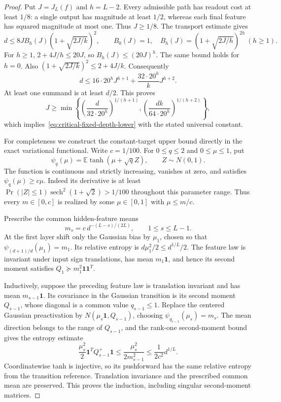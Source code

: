 \begin{proof}
Put $J=J_L(f)$ and $h=L-2$. Every admissible path has readout cost at
least $1/8$: a single output has magnitude at least $1/2$, whereas
each final feature has squared magnitude at most one. Thus $J\ge1/8$.
The transport estimate gives
\[
 d\le8J B_h(J)(1+\sqrt{2J/k})^2,
 \qquad B_0(J)=1,\quad
 B_h(J)=(1+\sqrt{2J/h})^{2h}\ (h\ge1).
\]
For $h\ge1$, $2+4J/h\le20J$, so $B_h(J)\le(20J)^h$.
The same bound holds for $h=0$. Also
$(1+\sqrt{2J/k})^2\le2+4J/k$. Consequently
\[
 d\le16\cdot20^h J^{h+1}
       +\frac{32\cdot20^h}{k}J^{h+2}.
\]
At least one summand is at least $d/2$. This proves
\[
 J\ge\min\left\{
 \left(\frac d{32\cdot20^h}\right)^{1/(h+1)},
 \left(\frac {dk}{64\cdot20^h}\right)^{1/(h+2)}\right\},
\]
which implies~\eqref{eq:critical-fixed-depth-lower} with the stated
universal constant.

For completeness we construct the constant-target upper bound directly
in the exact variational functional. Write $c=1/100$. For $0\le q\le2$
and $0\le\mu\le1$, put
\[
 \psi_q(\mu)=\mathbb E\tanh(\mu+\sqrt q Z),\qquad Z\sim N(0,1).
\]
The function is continuous and strictly increasing, vanishes at zero,
and satisfies $\psi_q(\mu)\ge c\mu$. Indeed its derivative is at least
$\Pr(|Z|\le1)\operatorname{sech}^2(1+\sqrt2)>1/100$ throughout
this parameter range. Thus every $m\in[0,c]$ is realized by some
$\mu\in[0,1]$ with $\mu\le m/c$.

Prescribe the common hidden-feature means
\[
 m_s=c\,d^{-(L-s)/(2L)},\qquad 1\le s\le L-1.
\]
At the first layer shift only the Gaussian bias by $\mu_1$, chosen
so that $\psi_{(d+1)/d}(\mu_1)=m_1$. Its relative entropy is
$d\mu_1^2/2\le d^{1/L}/2$. The feature law is invariant under input
sign translations, has mean $m_1\mathbf1$, and hence its second
moment satisfies $Q_1\succeq m_1^2\mathbf1\mathbf1^T$.

Inductively, suppose the preceding feature law is translation invariant
and has mean $m_{s-1}\mathbf1$. Its covariance in the Gaussian transition
is its second moment $Q_{s-1}$, whose diagonal is a common value
$q_{s-1}\le1$. Replace the centered Gaussian preactivation by
$N(\mu_s\mathbf1,Q_{s-1})$, choosing
$\psi_{q_{s-1}}(\mu_s)=m_s$. The mean direction belongs to the range
of $Q_{s-1}$, and the rank-one second-moment bound gives the entropy
estimate
\[
 \frac{\mu_s^2}{2}\mathbf1^TQ_{s-1}^+\mathbf1
 \le\frac{\mu_s^2}{2m_{s-1}^2}
 \le\frac1{2c^2}d^{1/L}.
\]
Coordinatewise tanh is injective, so its pushforward has the same
relative entropy from the transition reference. Translation invariance
and the prescribed common mean are preserved. This proves the induction,
including singular second-moment matrices.


\end{proof}
